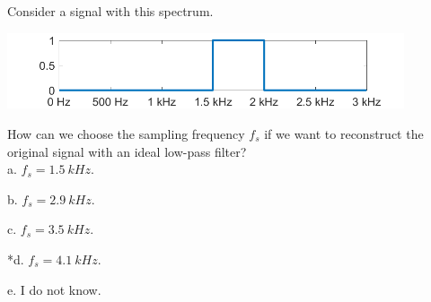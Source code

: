 
Consider a signal with this spectrum.

\includegraphics[width=4.60233in,height=0.88285in]{../../Images/SamplingAndAliasingQ1.png}

How can we choose the sampling frequency \(f_{s}\) if we want to reconstruct the original signal with an ideal low-pass filter? \\

a. \(f_{s} = 1.5\ kHz\).


b. \(f_{s} = 2.9\ kHz\).


c. \(f_{s} = 3.5\ kHz\).


*d. \(f_{s} = 4.1\ kHz\).


e. I do not know. \\

